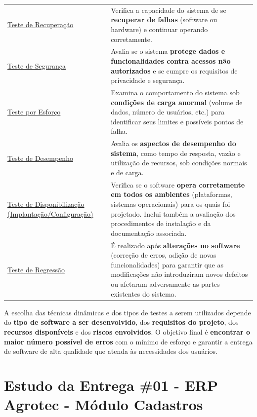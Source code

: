\documentclass[
]{book}
\begin{document}
\begin{longtable}[]{@{}
  >{\centering\arraybackslash}p{}
  >{\raggedright\arraybackslash}p{}@{}}
\toprule\noalign{}
\endhead
\bottomrule\noalign{}
\endlastfoot
\ul{Teste de Recuperação} & Verifica a capacidade do sistema de se \textbf{recuperar de falhas} (software ou hardware) e continuar operando corretamente. \\
\ul{Teste de Segurança} & Avalia se o sistema \textbf{protege dados e funcionalidades contra acessos não autorizados} e se cumpre os requisitos de privacidade e segurança. \\
\ul{Teste por Esforço} & Examina o comportamento do sistema sob \textbf{condições de carga anormal} (volume de dados, número de usuários, etc.) para identificar seus limites e possíveis pontos de falha. \\
\ul{Teste de Desempenho} & Avalia os \textbf{aspectos de desempenho do sistema}, como tempo de resposta, vazão e utilização de recursos, sob condições normais e de carga. \\
\ul{Teste de Disponibilização (Implantação/Configuração)} & Verifica se o software \textbf{opera corretamente em todos os ambientes} (plataformas, sistemas operacionais) para os quais foi projetado. Inclui também a avaliação dos procedimentos de instalação e da documentação associada. \\
\ul{Teste de Regressão} & É realizado após \textbf{alterações no software} (correção de erros, adição de novas funcionalidades) para garantir que as modificações não introduziram novos defeitos ou afetaram adversamente as partes existentes do sistema. \\
\end{longtable}

A escolha das técnicas dinâmicas e dos tipos de testes a serem utilizados depende do \textbf{tipo de software a ser desenvolvido}, dos \textbf{requisitos do projeto}, dos \textbf{recursos disponíveis} e dos \textbf{riscos envolvidos}. O objetivo final é \textbf{encontrar o maior número possível de erros} com o mínimo de esforço e garantir a entrega de software de alta qualidade que atenda às necessidades dos usuários.

\chapter{Estudo da Entrega \#01 - ERP Agrotec - Módulo Cadastros}\label{estudo-da-entrega-01---erp-agrotec---muxf3dulo-cadastros}
\end{document}
